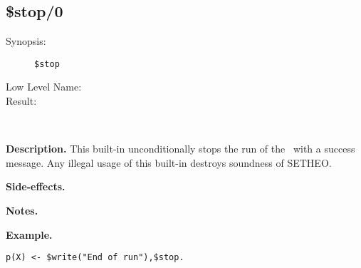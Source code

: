 %
%
%
\subsection{\$stop/0}

\begin{description}
\item[Synopsis:]
	{\tt \$stop}
\item[Low Level Name:]
	{\tt }
\item[Result:]\ \\
\end{description}

\vspace*{0.5cm}
\noindent
{\bf Description.}
This built-in unconditionally stops the run of the \SAM\ with a success
message. Any illegal usage of this built-in destroys soundness of
SETHEO.

\vspace*{0.5cm}
\noindent
{\bf Side-effects.}

\vspace*{0.5cm}
\noindent
{\bf Notes.}

\vspace*{0.5cm}
\noindent
{\bf Example.}
\begin{verbatim}
p(X) <- $write("End of run"),$stop.
\end{verbatim}


